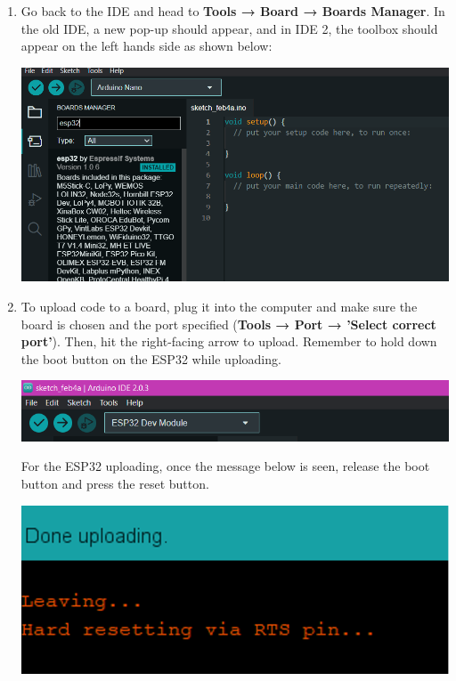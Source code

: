 \documentclass[a4paper,12pt]{report}
\newcommand{\imageWidth}{140mm}
\begin{document}
\begin{enumerate}
        \newpage
        \item Go back to the IDE and head to \textbf{Tools → Board → Boards Manager}. In the old IDE, a new pop-up should appear, and in IDE 2, the toolbox should appear on the left hands side as shown below:
        
        \begin{center}
            \includegraphics[width = \imageWidth]{Assets/Boards_manager.png}
        \end{center}
    
        \item To upload code to a board, plug it into the computer and make sure the board is chosen and the port specified (\textbf{Tools → Port → 'Select correct port'}). 
        Then, hit the right-facing arrow to upload. Remember to hold down the boot button on the ESP32 while uploading.
        \begin{center}
            \includegraphics[width = \imageWidth]{Assets/Upload.png}
        \end{center}
        For the ESP32 uploading, once the message below is seen, release the boot button and press the reset button.
        \begin{center}
            \includegraphics[scale = 0.7]{Assets/Hard_reset.png}
        \end{center}
    \end{enumerate}
\end{document}
